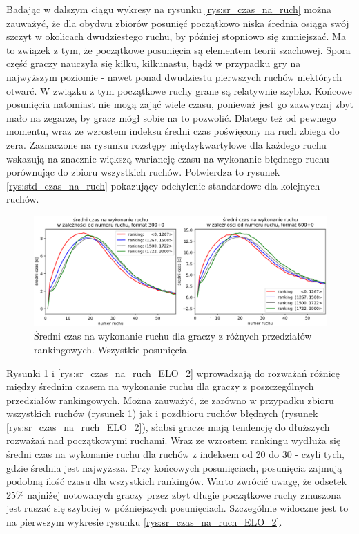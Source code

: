 \documentclass[inzynierska]{pwr_wmat_praca_dyplomowa}
\theoremstyle{plain}
\numberwithin{theorem}{chapter}
\theoremstyle{definition}
\numberwithin{theorem}{chapter}
\begin{document}
Badając w dalszym ciągu wykresy na rysunku \ref{rys:sr_czas_na_ruch} można zauważyć, że dla obydwu zbiorów posunięć początkowo niska średnia osiąga swój szczyt w okolicach dwudziestego ruchu, by później stopniowo się zmniejszać. Ma to związek z tym, że początkowe posunięcia są elementem teorii szachowej. Spora część graczy nauczyła się kilku, kilkunastu, bądź w przypadku gry na najwyższym poziomie - nawet ponad dwudziestu pierwszych ruchów niektórych otwarć. W związku z tym początkowe ruchy grane są relatywnie szybko. Końcowe posunięcia natomiast nie mogą zająć wiele czasu, ponieważ jest go zazwyczaj zbyt mało na zegarze, by gracz mógł sobie na to pozwolić. Dlatego też od pewnego momentu, wraz ze wzrostem indeksu średni czas poświęcony na ruch zbiega do zera. Zaznaczone na rysunku rozstępy międzykwartylowe dla każdego ruchu wskazują na znacznie większą wariancję czasu na wykonanie błędnego ruchu porównując do zbioru wszystkich ruchów. Potwierdza to rysunek \ref{rys:std_czas_na_ruch} pokazujący odchylenie standardowe dla kolejnych ruchów. 
\begin{figure}[h]
	\centering
	\includegraphics[width=\textwidth]{sr_czas_na_ruch_ELO_1.png}
	\caption{Średni czas na wykonanie ruchu dla graczy z różnych przedziałów rankingowych. Wszystkie posunięcia.}
	\label{rys:sr_czas_na_ruch_ELO_1}
\end{figure}

Rysunki \ref{rys:sr_czas_na_ruch_ELO_1} i \ref{rys:sr_czas_na_ruch_ELO_2} wprowadzają do rozważań różnicę między średnim czasem na wykonanie ruchu dla graczy z poszczególnych przedziałów rankingowych. Można zauważyć, że zarówno w przypadku zbioru wszystkich ruchów (rysunek \ref{rys:sr_czas_na_ruch_ELO_1}) jak i pozdbioru ruchów błędnych (rysunek \ref{rys:sr_czas_na_ruch_ELO_2}), słabsi gracze mają tendencję do dłuższych rozważań nad początkowymi ruchami. Wraz ze wzrostem rankingu wydłuża się średni czas na wykonanie ruchu dla ruchów z indeksem od 20 do 30 - czyli tych, gdzie średnia jest najwyższa. Przy końcowych posunięciach, posunięcia zajmują podobną ilość czasu dla wszystkich rankingów. Warto zwrócić uwagę, że odsetek 25\% najniżej notowanych graczy przez zbyt długie początkowe ruchy zmuszona jest ruszać się szybciej w późniejszych posunięciach. Szczególnie widoczne jest to na pierwszym wykresie rysunku \ref{rys:sr_czas_na_ruch_ELO_2}. 
\end{document}
